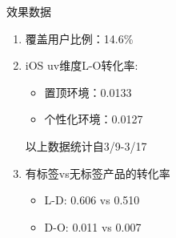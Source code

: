 \documentclass{beamer}
\begin{document}
\begin{CJK}{UTF8}{gbsn}
\begin{frame}{效果数据}
  \begin{enumerate}
  \item {覆盖用户比例：14.6\%}
  \item {
    iOS uv维度L-O转化率:
    \begin{itemize}
    \item { 置顶环境：0.0133 }
    \item { 个性化环境：0.0127 }
    \end{itemize}
    以上数据统计自3/9-3/17
  }
  \item {
    有标签vs无标签产品的转化率
    \begin{itemize}
    \item { L-D: 0.606 vs 0.510 }
    \item { D-O: 0.011 vs 0.007}
    \end {itemize}
  }
  \end{enumerate}
\end{frame}


\end{CJK}
\end{document}
